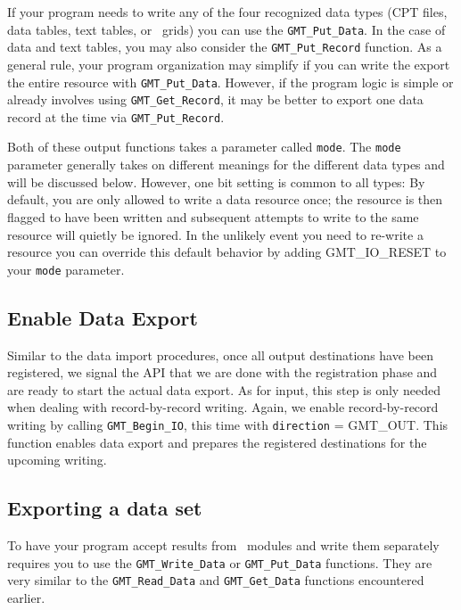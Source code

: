 \documentclass[11pt]{report}
\begin{document}
If your program needs to write any of the four recognized data types (CPT files, data tables, text tables, or \GMT\ grids)
you can use the \texttt{GMT\_Put\_Data}. In the case of data and text tables, you may also consider the
\texttt{GMT\_Put\_Record} function.
As a general rule, your program organization may simplify if you can write the export the entire resource with
\texttt{GMT\_Put\_Data}.  However, if the program logic is simple or already involves using \texttt{GMT\_Get\_Record},
it may be better to export one data record at the time via \texttt{GMT\_Put\_Record}.


Both of these output functions takes a parameter called \texttt{mode}.  The \texttt{mode} parameter generally
takes on different meanings for the different data types and will be discussed below.
However, one bit setting is common to all types: By default, you are only allowed to write a
data resource once; the resource is then flagged to have been written and subsequent attempts to write
to the same resource will quietly be ignored.  In the unlikely event you need to re-write a
resource you can override this default behavior by adding GMT\_IO\_RESET to your \texttt{mode} parameter.

\subsection{Enable Data Export}

Similar to the data import procedures, once all output destinations have been registered, we signal the API that we are done with the registration
phase and are ready to start the actual data export.  As for input, this step is only needed when dealing with record-by-record writing.
Again, we enable record-by-record writing by calling \texttt{GMT\_Begin\_IO}, this time with \texttt{direction} = GMT\_OUT.
This function enables data export and prepares the registered destinations for the upcoming writing.  


\subsection{Exporting a data set}

To have your program accept results from \GMT\ modules and write them
separately requires you to use the \texttt{GMT\_Write\_Data} or \texttt{GMT\_Put\_Data} functions.  They are
very similar to the \texttt{GMT\_Read\_Data} and \texttt{GMT\_Get\_Data} functions encountered earlier.
\end{document}
